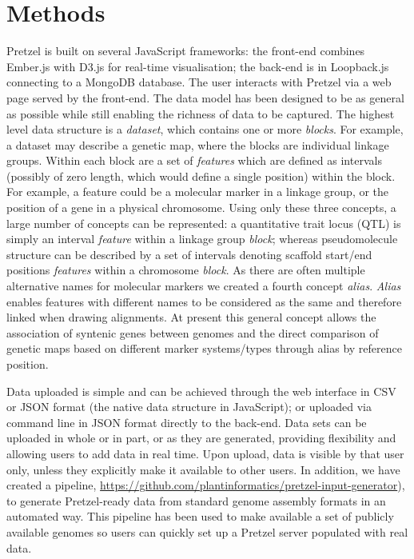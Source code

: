 \section{Methods}

Pretzel is built on several JavaScript frameworks: the front-end combines Ember.js with D3.js
  for real-time visualisation; the back-end is in Loopback.js connecting to a MongoDB database. 
%
The user interacts with Pretzel via a web page served by the front-end. 
%
The data model has been designed to be as general as possible while still enabling the richness of
  data to be captured. 
%
  The highest level data structure is a \textit{dataset}, which contains one or more \textit{blocks}.
%
For example, a dataset may describe a genetic map, where the blocks are individual linkage groups. 
%
  Within each block are a set of \textit{features} which are defined as intervals (possibly of zero length,
  which would define a single position) within the block. 
%
For example, a feature could be a molecular marker in a linkage group, or the position of a gene in
  a physical chromosome. 
%
Using only these three concepts, a large number of concepts can be represented: a quantitative trait locus
  (QTL) is simply an interval \textit{feature} within a linkage group \textit{block}; whereas pseudomolecule structure can be described by a
  set of intervals denoting scaffold start/end positions \textit{features} within a chromosome \textit{block}. 
%
As there are often multiple alternative names for molecular markers we created a fourth concept \textit{alias}. 
\textit{Alias} enables features with different names to be considered as the same and therefore linked when drawing alignments. 
%
At present this general concept allows the association of syntenic genes between genomes and the direct comparison of genetic maps
  based on different marker systems/types through alias by reference position.

Data uploaded is simple and can be achieved through the web interface in CSV or JSON format (the native data structure in
  JavaScript); or uploaded via command line in JSON format directly to the back-end. 
%
Data sets can be uploaded in whole or in part, or as they are generated, providing flexibility and allowing users to add data in real time.
%
Upon upload, data is visible by that user only, unless they explicitly make it available to other users. 
%
In addition, we have created a pipeline, 
  \href{https://github.com/plantinformatics/pretzel-input-generator}{https://github.com/plantinformatics/pretzel-input-generator}), 
  to generate Pretzel-ready data
  from standard genome assembly formats in an automated way. This pipeline has been used to make
  available a set of publicly available genomes so users can quickly set up a Pretzel server
  populated with real data.

